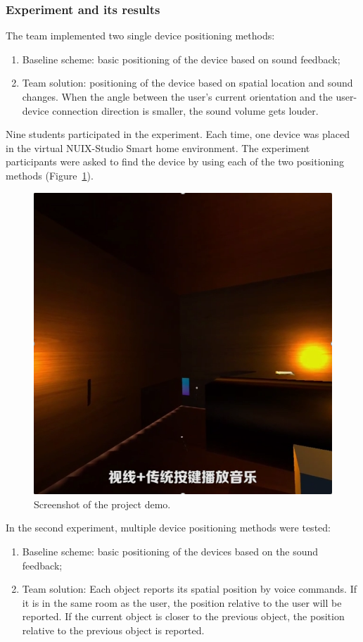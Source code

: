 \subsubsection{Experiment and its results}
The team implemented two single device positioning methods:
\begin{enumerate}
    \item Baseline scheme: basic positioning of the device based on sound feedback;
    \item Team solution: positioning of the device based on spatial location and sound changes. When the angle between the user's current orientation and the user-device connection direction is smaller, the sound volume gets louder.
\end{enumerate}

Nine students participated in the experiment. Each time, one device was placed in the virtual NUIX-Studio Smart home environment. The experiment participants were asked to find the device by using each of the two positioning methods (Figure~\ref{fig:Project1-1-figure}).

\begin{figure}
  \centering
  \includegraphics[width=0.6\linewidth]{figures/Project_1-1.png}
  \caption{Screenshot of the project demo.}
  \label{fig:Project1-1-figure}
\end{figure}

In the second experiment, multiple device positioning methods were tested:
\begin{enumerate}
    \item Baseline scheme: basic positioning of the devices based on the sound feedback;
    \item Team solution: Each object reports its spatial position by voice commands. If it is in the same room as the user, the position relative to the user will be reported. If the current object is closer to the previous object, the position relative to the previous object is reported. \end{enumerate}

